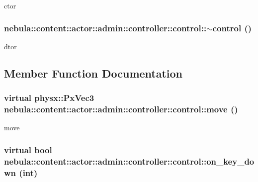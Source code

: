 ctor \hypertarget{classnebula_1_1content_1_1actor_1_1admin_1_1controller_1_1control_afd0ef4ca6eb5e0bd193cd094fa521930}{
\subsubsection[{$\sim$control}]{\setlength{\rightskip}{0pt plus 5cm}nebula::content::actor::admin::controller::control::$\sim$control ()}}
\label{classnebula_1_1content_1_1actor_1_1admin_1_1controller_1_1control_afd0ef4ca6eb5e0bd193cd094fa521930}


dtor 

\subsection{Member Function Documentation}
\hypertarget{classnebula_1_1content_1_1actor_1_1admin_1_1controller_1_1control_ae89c14aaec5775c76952477ef03e022f}{
\subsubsection[{move}]{\setlength{\rightskip}{0pt plus 5cm}virtual physx::PxVec3 nebula::content::actor::admin::controller::control::move ()}}
\label{classnebula_1_1content_1_1actor_1_1admin_1_1controller_1_1control_ae89c14aaec5775c76952477ef03e022f}


move \hypertarget{classnebula_1_1content_1_1actor_1_1admin_1_1controller_1_1control_a7293da4d566696cef20a6c38cc718ec7}{
\subsubsection[{on\_\-key\_\-down}]{\setlength{\rightskip}{0pt plus 5cm}virtual bool nebula::content::actor::admin::controller::control::on\_\-key\_\-down (int)}}
\label{classnebula_1_1content_1_1actor_1_1admin_1_1controller_1_1control_a7293da4d566696cef20a6c38cc718ec7}



